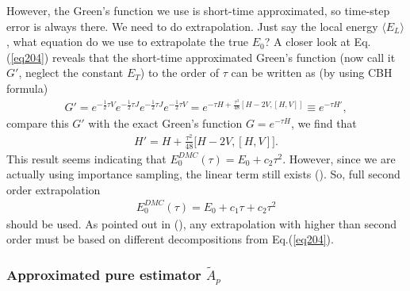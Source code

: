 \documentclass[12pt,letterpaper,UTF8]{report}
\begin{document}
{However, the Green's function we use is short-time approximated, so time-step error is always there. We need to do extrapolation. Just say the local energy $\langle E_L \rangle$, what equation do we use to extrapolate the true $E_0$?
A closer look at Eq.(\ref{eq204}) reveals that the short-time approximated Green's function (now call it $G'$, neglect the constant $E_T$) to the  order of $\tau$ can be written as (by using CBH formula)
\begin{eqnarray}
G'=  e^{-\frac{1}{2}\tau V} e^{-\frac{1}{2}\tau J} e^{-\frac{1}{2}\tau J} e^{-\frac{1}{2}\tau V}
= e^{-\tau H + \frac{\tau^3}{48}[H-2V, [H,V]] }
 \equiv  e^{-\tau H'},
\end{eqnarray}
compare this $G'$ with the exact Green's function $G=e^{-\tau H}$, we find that
\begin{eqnarray}
H' = H + \frac{\tau^2}{48} \big[  H-2V, [H,V]  \big].
\end{eqnarray}
This result seems indicating that $E_0^{DMC}(\tau) = E_0 + c_2 \tau^2$. However, since we are actually using importance sampling, the linear term still exists (\cite{VesaPDF,Chin90}). So, full second order extrapolation
\begin{eqnarray}
E_0^{DMC}(\tau) = E_0 + c_1 \tau + c_2 \tau^2 \label{2ndextrap}
 \end{eqnarray}
should be used. As pointed out in (\cite{VesaPDF}), any extrapolation with higher than second order must be based on different decompositions from Eq.(\ref{eq204}).





\subsubsection{Approximated pure estimator $\tilde{A}_p$} \label{secDMCests}

}
\end{document}
